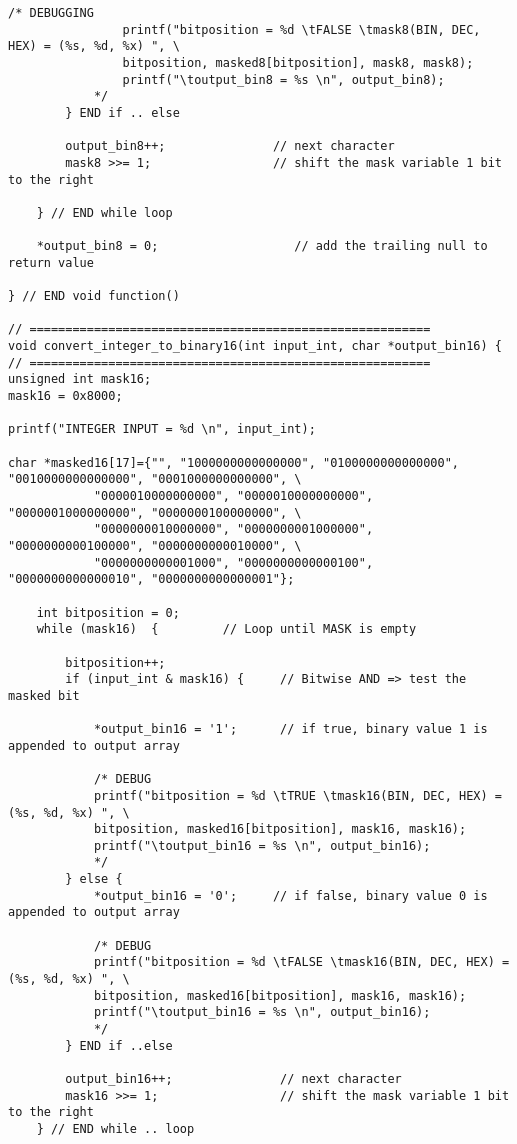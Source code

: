 \begin{lstlisting}[caption={App4-Converting-software-codes-to-binary-bits-pulses}, label=App4-Converting-software-codes-to-binary-bits-pulses]
			/* DEBUGGING	      	
				printf("bitposition = %d \tFALSE \tmask8(BIN, DEC, HEX) = (%s, %d, %x) ", \
				bitposition, masked8[bitposition], mask8, mask8);
				printf("\toutput_bin8 = %s \n", output_bin8);
			*/
		} END if .. else

		output_bin8++;               // next character
		mask8 >>= 1;                 // shift the mask variable 1 bit to the right
		
	} // END while loop
	
	*output_bin8 = 0;                 	// add the trailing null to return value 
	
} // END void function()

// ========================================================
void convert_integer_to_binary16(int input_int, char *output_bin16) {
// ========================================================
unsigned int mask16;
mask16 = 0x8000;

printf("INTEGER INPUT = %d \n", input_int);

char *masked16[17]={"", "1000000000000000", "0100000000000000", "0010000000000000", "0001000000000000", \
			"0000010000000000", "0000010000000000", "0000001000000000", "0000000100000000", \
			"0000000010000000", "0000000001000000", "0000000000100000", "0000000000010000", \
			"0000000000001000", "0000000000000100", "0000000000000010", "0000000000000001"};

	int bitposition = 0;    
	while (mask16)  {         // Loop until MASK is empty

		bitposition++;
		if (input_int & mask16) {     // Bitwise AND => test the masked bit

			*output_bin16 = '1';      // if true, binary value 1 is appended to output array
		
			/* DEBUG               
			printf("bitposition = %d \tTRUE \tmask16(BIN, DEC, HEX) = (%s, %d, %x) ", \
			bitposition, masked16[bitposition], mask16, mask16);
			printf("\toutput_bin16 = %s \n", output_bin16);
			*/
		} else {
			*output_bin16 = '0';     // if false, binary value 0 is appended to output array

			/* DEBUG	      	
			printf("bitposition = %d \tFALSE \tmask16(BIN, DEC, HEX) = (%s, %d, %x) ", \
			bitposition, masked16[bitposition], mask16, mask16);
			printf("\toutput_bin16 = %s \n", output_bin16);
			*/
		} END if ..else

		output_bin16++;               // next character
		mask16 >>= 1;                 // shift the mask variable 1 bit to the right
	} // END while .. loop


\end{lstlisting}
